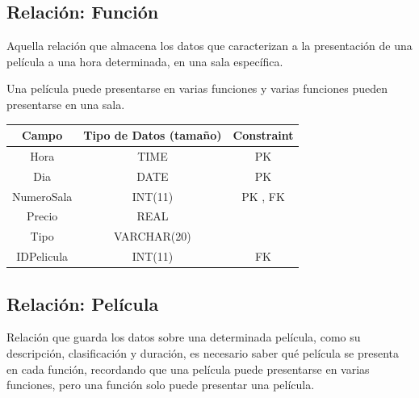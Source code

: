 \documentclass[12pt, fleqn]{report}                             %
\begin{document}
        \subsection*{Relación: Función}

            Aquella relación que almacena los datos que caracterizan a la presentación
            de una película a una hora determinada, en una sala específica.

            Una película puede presentarse en varias funciones y varias funciones pueden
            presentarse en una sala.

            \vspace{2em}

            \small{
            \begin{tabular}{| c | c | c |}
                \hline
                \textbf{Campo} & \textbf{Tipo de Datos (tamaño)} & \textbf{Constraint} \\[0.5ex] 
                \hline\hline
                
                Hora        & TIME          & PK                        \\
                Dia         & DATE          & PK                        \\
                NumeroSala  & INT(11)       & PK , FK                   \\
                Precio      & REAL          &                           \\
                Tipo        & VARCHAR(20)   &                           \\
                IDPelicula  & INT(11)       & FK                        \\
                \hline
            \end{tabular}
            }


        \subsection*{Relación: Película}

            Relación que guarda los datos sobre una determinada película, como su
            descripción, clasificación y duración, es necesario saber qué película
            se presenta en cada función, recordando que una película puede presentarse
            en varias funciones, pero una función solo puede presentar una película.

            \vspace{2em}
\end{document}
